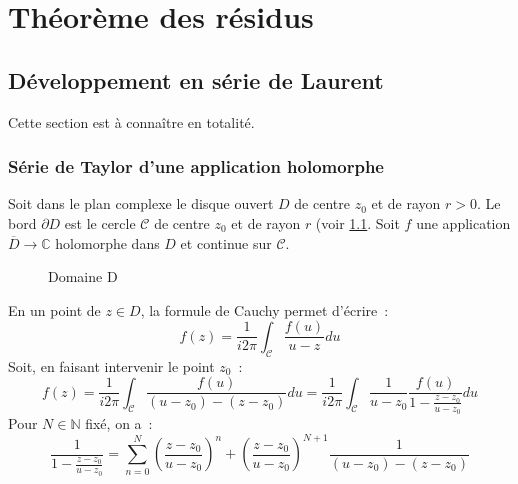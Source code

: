 \chapter{Théorème des résidus}
\section{Développement en série de Laurent}
Cette section est à connaître en totalité.
\subsection{Série de Taylor d'une application holomorphe}
Soit dans le plan complexe le disque ouvert $D$ de centre $z_0$ et de rayon
$r>0$. Le bord $\partial D$ est le cercle $\mathcal{C}$ de centre $z_0$ et de
rayon $r$ (voir \ref{Fi:Taylor}. Soit $f$ une application $\overline{D} \to
\mathbb{C}$ holomorphe dans $D$ et continue sur $\mathcal{C}$.
\begin{figure}
\caption{Domaine D}\label{Fi:Taylor}
\end{figure}
En un point de $z \in D$, la formule de Cauchy permet d'écrire~:
\[
f(z) = \frac{1}{i2\pi}\int_{\mathcal{C}} \frac{f(u)}{u-z} du
\]
Soit, en faisant intervenir le point $z_0$~:
\[
f(z) = \frac{1}{i2\pi}\int_{\mathcal{C}} \frac{f(u)}{(u-z_0)-(z-z_0)} du =
\frac{1}{i2\pi}\int_{\mathcal{C}}
\frac{1}{u-z_0}\frac{f(u)}{1-\frac{z-z_0}{u-z_0}} du
\]
Pour $N \in \mathbb{N}$ fixé, on a~:
\[
\frac{1}{1-\frac{z-z_0}{u-z_0}} = \sum_{n=0}^N \left ( \frac{z-z_0}{u-z_0}
\right )^n + \left ( \frac{z-z_0}{u-z_0}
\right )^{N+1} \frac{1}{(u-z_0)-(z-z_0)}
\]
